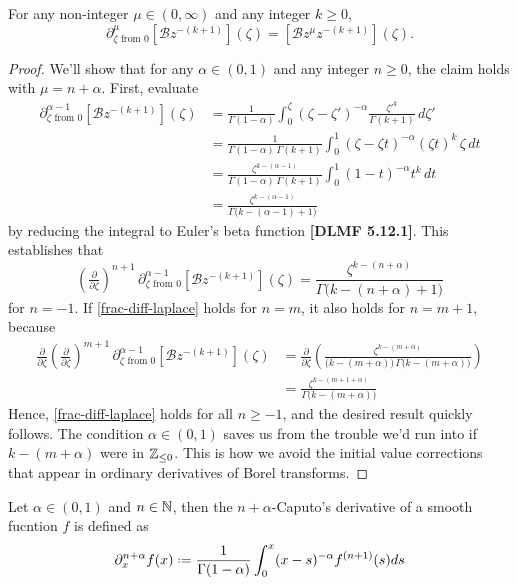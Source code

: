\documentclass[11pt,a4paper,twoside,leqno,noamsfonts]{amsart}
\numberwithin{equation}{section}
\newcommand{\borel}{\mathcal{B}}
\begin{document}
\begin{lemma}
For any non-integer $\mu \in (0, \infty)$ and any integer $k \ge 0$,
\[ \partial^\mu_{\zeta \text{ from } 0} \left[ \borel z^{-(k+1)} \right](\zeta) = \left[ \borel z^\mu z^{-(k+1)} \right](\zeta). \]
\end{lemma}
\begin{proof}
We'll show that for any $\alpha \in (0, 1)$ and any integer $n \ge 0$, the claim holds with $\mu = n + \alpha$. First, evaluate
\begin{align*}
\partial^{\alpha-1}_{\zeta \text{ from } 0} \left[ \borel z^{-(k+1)} \right](\zeta) & = \frac{1}{\Gamma(1-\alpha)} \int_0^\zeta (\zeta-\zeta')^{-\alpha} \frac{{\zeta'}^k}{\Gamma(k+1)}\,d\zeta' \\
& = \frac{1}{\Gamma(1-\alpha)\,\Gamma(k+1)} \int_0^1 (\zeta-\zeta t)^{-\alpha} (\zeta t)^k\,\zeta\,dt \\
& = \frac{\zeta^{k-(\alpha-1)}}{\Gamma(1-\alpha)\,\Gamma(k+1)} \int_0^1 (1-t)^{-\alpha} t^k\,dt \\
& = \frac{\zeta^{k-(\alpha-1)}}{\Gamma\big(k-(\alpha-1)+1\big)}
\end{align*}
by reducing the integral to Euler's beta function \textbf{[DLMF 5.12.1]}. This establishes that
\begin{equation}\label{frac-diff-laplace}
\left(\tfrac{\partial}{\partial \zeta}\right)^{n+1}\,\partial^{\alpha-1}_{\zeta \text{ from } 0} \left[ \borel z^{-(k+1)} \right](\zeta) = \frac{\zeta^{k-(n+\alpha)}}{\Gamma\big(k-(n+\alpha)+1\big)}
\end{equation}
for $n = -1$. If \eqref{frac-diff-laplace} holds for $n = m$, it also holds for $n = m+1$, because
\begin{align*}
\tfrac{\partial}{\partial \zeta} \left(\tfrac{\partial}{\partial \zeta}\right)^{m+1}\,\partial^{\alpha-1}_{\zeta \text{ from } 0} \left[ \borel z^{-(k+1)} \right](\zeta) & = \tfrac{\partial}{\partial \zeta} \left( \frac{\zeta^{k-(m+\alpha)}}{\big(k-(m+\alpha)\big)\,\Gamma\big(k-(m+\alpha)\big)} \right) \\
& = \frac{\zeta^{k-(m+1+\alpha)}}{\Gamma\big(k-(m+\alpha)\big)}
\end{align*}
Hence, \eqref{frac-diff-laplace} holds for all $n \ge -1$, and the desired result quickly follows. The condition $\alpha \in (0, 1)$ saves us from the trouble we'd run into if $k-(m+\alpha)$ were in $\mathbb Z_{\le 0}$. This is how we avoid the initial value corrections that appear in ordinary derivatives of Borel transforms.
\end{proof}
\color{MidnightBlue}
\begin{definition}
Let $\alpha\in (0,1)$ and $n\in\mathbb N$, then the $n+\alpha$-Caputo's derivative of a smooth fucntion $f$ is defined as
\begin{equation}
\partial_x^{n+\alpha}f(x)\defeq\frac{1}{\Gamma(1-\alpha)}\int_0^x(x-s)^{-\alpha}f^{(n+1)}(s)ds
\end{equation}
\end{definition}
\end{document}
